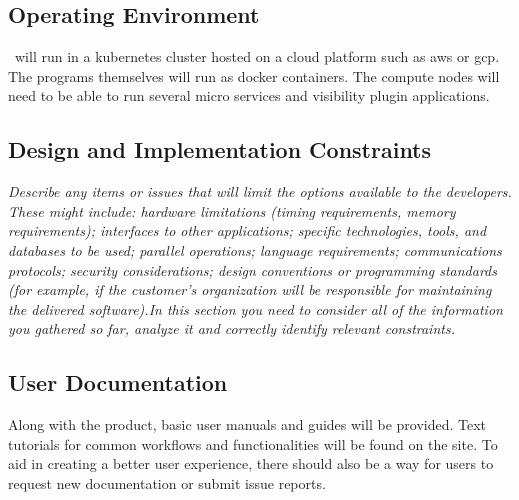     \subsection{Operating Environment}\label{sec:operating-environment}
        \projectName\ will run in a \gls{kubernetes} cluster hosted on a cloud platform such as \gls{aws} or \gls{gcp}. The programs themselves will run as \gls{docker} containers. The compute nodes will need to be able to run several micro services and visibility plugin applications.
    \subsection{Design and Implementation Constraints}\label{sec:design-constraints}
        \emph{Describe any items or issues that will limit the options available to the developers. These might include: hardware limitations (timing requirements, memory requirements); interfaces to other applications; specific technologies, tools, and databases to be used; parallel operations; language requirements; communications protocols; security considerations; design conventions or programming standards (for example, if the customer’s organization will be responsible for maintaining the delivered software).\gnl In this section you need to consider all of the information you gathered so far, analyze it and correctly identify relevant constraints.}
    \subsection{User Documentation}\label{sec:user-documentation}
        Along with the product, basic user manuals and guides will be provided. Text tutorials for common workflows and functionalities will be found on the site. To aid in creating a better user experience, there should also be a way for users to request new documentation or submit issue reports.
